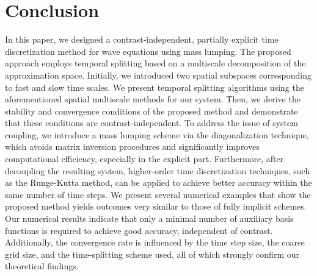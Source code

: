 \documentclass[preprint,12pt]{elsarticle}
\begin{document}



\section{Conclusion}\label{007}
In this paper, we designed a contrast-independent, partially explicit time discretization method for wave equations using mass lumping. The proposed approach employs temporal splitting based on a multiscale decomposition of the approximation space. Initially, we introduced two spatial subspaces corresponding to fast and slow time scales. We present temporal splitting algorithms using the aforementioned spatial multiscale methods for our system. Then, we derive the stability and convergence conditions of the proposed method and demonstrate that these conditions are contrast-independent.
To address the issue of system coupling, we introduce a mass lumping scheme via the diagonalization technique, which avoids matrix inversion procedures and significantly improves computational efficiency, especially in the explicit part. Furthermore, after decoupling the resulting system, higher-order time discretization techniques, such as the Runge-Kutta method, can be applied to achieve better accuracy within the same number of time steps.
We present several numerical examples that show the proposed method yields outcomes very similar to those of fully implicit schemes. Our numerical results indicate that only a minimal number of auxiliary basis functions is required to achieve good accuracy, independent of contrast. Additionally, the convergence rate is influenced by the time step size, the coarse grid size, and the time-splitting scheme used, all of which strongly confirm our theoretical findings.
\end{document}
